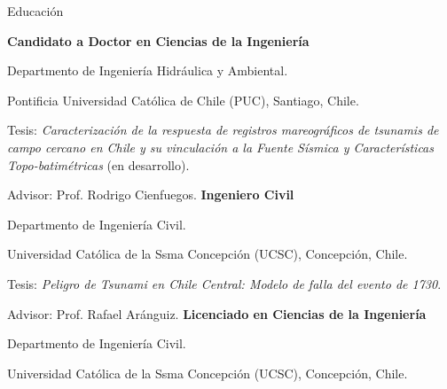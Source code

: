 \begin{rubric}{Educación}

\entry*[Since  2015]%
	\textbf{Candidato a Doctor en Ciencias de la Ingeniería}
	\par Departmento de Ingeniería Hidráulica y Ambiental.
	 \par Pontificia Universidad Cat\'olica de Chile (PUC), Santiago, Chile.
	 \par Tesis: \emph{Caracterización de la respuesta de registros mareográficos de tsunamis de campo cercano en Chile y su vinculación a la Fuente Sísmica y Características Topo-batimétricas} (en desarrollo).
	 \par Advisor: Prof. Rodrigo Cienfuegos.
%
\entry*[2008 -- 2015]%
	\textbf{Ingeniero Civil}
	\par Departmento de Ingeniería Civil.
	 \par Universidad Cat\'olica de la Ssma Concepci\'on (UCSC), Concepci\'on, Chile.
	 \par Tesis: \emph{Peligro de Tsunami en Chile Central: Modelo de falla del evento de 1730}.
	 \par Advisor: Prof. Rafael Ar\'anguiz.
%
\entry*[2008 -- 2012]%
	\textbf{Licenciado en Ciencias de la Ingeniería}
	\par Departmento de Ingeniería Civil. 
	\par Universidad Cat\'olica de la Ssma Concepci\'on (UCSC), Concepci\'on, Chile. %
\end{rubric}
